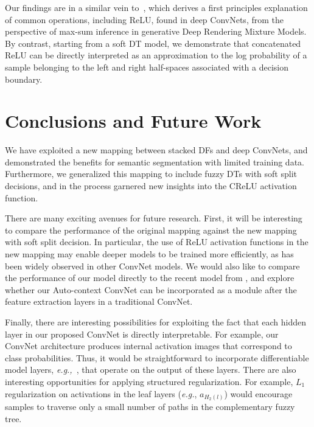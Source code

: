 \documentclass[twocolumn]{svjour3}
\begin{document}
Our findings are in a similar vein to~\cite{Patel}, which derives a first principles explanation of common operations, including ReLU, found in deep ConvNets, from the perspective of max-sum inference in generative Deep Rendering Mixture Models.
By contrast, starting from a soft DT model, we demonstrate that concatenated ReLU can be directly interpreted as an approximation to the log probability of a sample belonging to the left and right half-spaces associated with a decision boundary.


\section{Conclusions and Future Work}

We have exploited a new mapping between stacked DFs and deep ConvNets, and demonstrated the benefits for semantic segmentation with limited training data.
Furthermore, we generalized this mapping to include fuzzy DTs with soft split decisions, and in the process garnered new insights into the CReLU activation function.

There are many exciting avenues for future research.
First, it will be interesting to compare the performance of the original mapping against the new mapping with soft split decision.
In particular, the use of ReLU activation functions in the new mapping may enable deeper models to be trained more efficiently, as has been widely observed in other ConvNet models.
We would also like to compare the performance of our model directly to the recent model from \cite{DeepNDFs}, and explore whether our Auto-context ConvNet can be incorporated as a module after the feature extraction layers in a traditional ConvNet.

Finally, there are interesting possibilities for exploiting the fact that each hidden layer in our proposed ConvNet is directly interpretable.
For example, our ConvNet architecture produces internal activation images that correspond to class probabilities.
Thus, it would be straightforward to incorporate differentiable model layers, \emph{e.g.,}~\cite{Girshick:2014um}, that operate on the output of these layers.
There are also interesting opportunities for applying structured regularization.  For example, $L_1$ regularization on activations in the leaf layers (\textit{e.g.}, $a_{H_2(l)}$) would encourage samples to traverse only a small number of paths in the complementary fuzzy tree.

      
   
\end{document}
